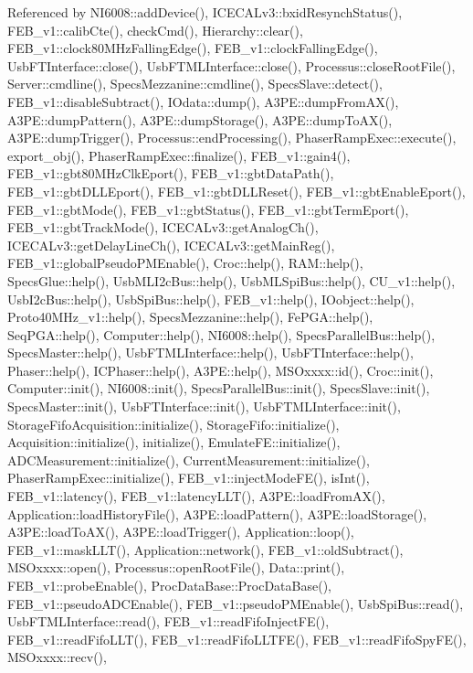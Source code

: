 Referenced by N\+I6008\+::add\+Device(), I\+C\+E\+C\+A\+Lv3\+::bxid\+Resynch\+Status(), F\+E\+B\+\_\+v1\+::calib\+Cte(), check\+Cmd(), Hierarchy\+::clear(), F\+E\+B\+\_\+v1\+::clock80\+M\+Hz\+Falling\+Edge(), F\+E\+B\+\_\+v1\+::clock\+Falling\+Edge(), Usb\+F\+T\+Interface\+::close(), Usb\+F\+T\+M\+L\+Interface\+::close(), Processus\+::close\+Root\+File(), Server\+::cmdline(), Specs\+Mezzanine\+::cmdline(), Specs\+Slave\+::detect(), F\+E\+B\+\_\+v1\+::disable\+Subtract(), I\+Odata\+::dump(), A3\+P\+E\+::dump\+From\+A\+X(), A3\+P\+E\+::dump\+Pattern(), A3\+P\+E\+::dump\+Storage(), A3\+P\+E\+::dump\+To\+A\+X(), A3\+P\+E\+::dump\+Trigger(), Processus\+::end\+Processing(), Phaser\+Ramp\+Exec\+::execute(), export\+\_\+obj(), Phaser\+Ramp\+Exec\+::finalize(), F\+E\+B\+\_\+v1\+::gain4(), F\+E\+B\+\_\+v1\+::gbt80\+M\+Hz\+Clk\+Eport(), F\+E\+B\+\_\+v1\+::gbt\+Data\+Path(), F\+E\+B\+\_\+v1\+::gbt\+D\+L\+L\+Eport(), F\+E\+B\+\_\+v1\+::gbt\+D\+L\+L\+Reset(), F\+E\+B\+\_\+v1\+::gbt\+Enable\+Eport(), F\+E\+B\+\_\+v1\+::gbt\+Mode(), F\+E\+B\+\_\+v1\+::gbt\+Status(), F\+E\+B\+\_\+v1\+::gbt\+Term\+Eport(), F\+E\+B\+\_\+v1\+::gbt\+Track\+Mode(), I\+C\+E\+C\+A\+Lv3\+::get\+Analog\+Ch(), I\+C\+E\+C\+A\+Lv3\+::get\+Delay\+Line\+Ch(), I\+C\+E\+C\+A\+Lv3\+::get\+Main\+Reg(), F\+E\+B\+\_\+v1\+::global\+Pseudo\+P\+M\+Enable(), Croc\+::help(), R\+A\+M\+::help(), Specs\+Glue\+::help(), Usb\+M\+L\+I2c\+Bus\+::help(), Usb\+M\+L\+Spi\+Bus\+::help(), C\+U\+\_\+v1\+::help(), Usb\+I2c\+Bus\+::help(), Usb\+Spi\+Bus\+::help(), F\+E\+B\+\_\+v1\+::help(), I\+Oobject\+::help(), Proto40\+M\+Hz\+\_\+v1\+::help(), Specs\+Mezzanine\+::help(), Fe\+P\+G\+A\+::help(), Seq\+P\+G\+A\+::help(), Computer\+::help(), N\+I6008\+::help(), Specs\+Parallel\+Bus\+::help(), Specs\+Master\+::help(), Usb\+F\+T\+M\+L\+Interface\+::help(), Usb\+F\+T\+Interface\+::help(), Phaser\+::help(), I\+C\+Phaser\+::help(), A3\+P\+E\+::help(), M\+S\+Oxxxx\+::id(), Croc\+::init(), Computer\+::init(), N\+I6008\+::init(), Specs\+Parallel\+Bus\+::init(), Specs\+Slave\+::init(), Specs\+Master\+::init(), Usb\+F\+T\+Interface\+::init(), Usb\+F\+T\+M\+L\+Interface\+::init(), Storage\+Fifo\+Acquisition\+::initialize(), Storage\+Fifo\+::initialize(), Acquisition\+::initialize(), initialize(), Emulate\+F\+E\+::initialize(), A\+D\+C\+Measurement\+::initialize(), Current\+Measurement\+::initialize(), Phaser\+Ramp\+Exec\+::initialize(), F\+E\+B\+\_\+v1\+::inject\+Mode\+F\+E(), is\+Int(), F\+E\+B\+\_\+v1\+::latency(), F\+E\+B\+\_\+v1\+::latency\+L\+L\+T(), A3\+P\+E\+::load\+From\+A\+X(), Application\+::load\+History\+File(), A3\+P\+E\+::load\+Pattern(), A3\+P\+E\+::load\+Storage(), A3\+P\+E\+::load\+To\+A\+X(), A3\+P\+E\+::load\+Trigger(), Application\+::loop(), F\+E\+B\+\_\+v1\+::mask\+L\+L\+T(), Application\+::network(), F\+E\+B\+\_\+v1\+::old\+Subtract(), M\+S\+Oxxxx\+::open(), Processus\+::open\+Root\+File(), Data\+::print(), F\+E\+B\+\_\+v1\+::probe\+Enable(), Proc\+Data\+Base\+::\+Proc\+Data\+Base(), F\+E\+B\+\_\+v1\+::pseudo\+A\+D\+C\+Enable(), F\+E\+B\+\_\+v1\+::pseudo\+P\+M\+Enable(), Usb\+Spi\+Bus\+::read(), Usb\+F\+T\+M\+L\+Interface\+::read(), F\+E\+B\+\_\+v1\+::read\+Fifo\+Inject\+F\+E(), F\+E\+B\+\_\+v1\+::read\+Fifo\+L\+L\+T(), F\+E\+B\+\_\+v1\+::read\+Fifo\+L\+L\+T\+F\+E(), F\+E\+B\+\_\+v1\+::read\+Fifo\+Spy\+F\+E(), M\+S\+Oxxxx\+::recv(), 